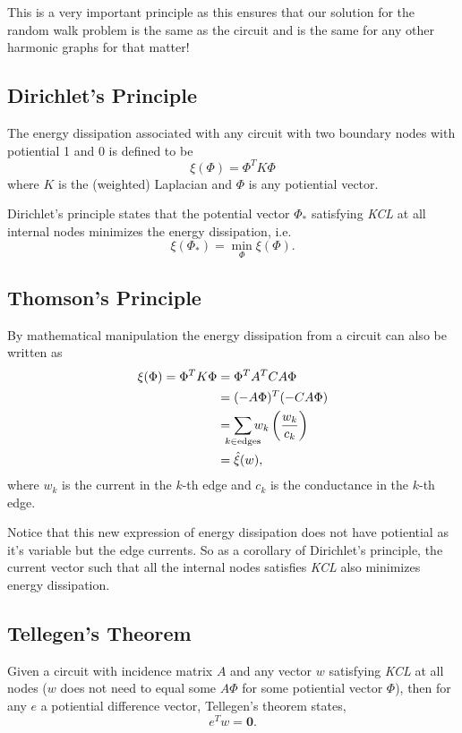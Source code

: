 \documentclass[]{article}
\begin{document}
This is a very important principle as this ensures that our solution for
the random walk problem is the same as the circuit and is the same for
any other harmonic graphs for that matter!

\subsection{Dirichlet's Principle}\label{dirichlets-principle}

The energy dissipation associated with any circuit with two boundary
nodes with potiential 1 and 0 is defined to be \[
\xi(\Phi) = \Phi^T K \Phi
\] where \(K\) is the (weighted) Laplacian and \(\Phi\) is any
potiential vector.

Dirichlet's principle states that the potential vector \(\Phi_*\)
satisfying \emph{KCL} at all internal nodes minimizes the energy
dissipation, i.e. \[\xi(\Phi_*) = \min_\Phi \xi(\Phi).\]

\subsection{Thomson's Principle}\label{thomsons-principle}

By mathematical manipulation the energy dissipation from a circuit can
also be written as \[
\begin{split}
\xi(\Phi) = \Phi^T K \Phi & = \Phi^T A^T C A \Phi\\
& = (-A \Phi)^T (-CA \Phi)\\
& = \sum_{\mathclap{k \in \text{edges}}} w_k\left(\frac{w_k}{c_k}\right)\\
& = \hat{\xi}(w),
\end{split}
\] where \(w_k\) is the current in the \(k\)-th edge and \(c_k\) is the
conductance in the \(k\)-th edge.

Notice that this new expression of energy dissipation does not have
potiential as it's variable but the edge currents. So as a corollary of
Dirichlet's principle, the current vector such that all the internal
nodes satisfies \emph{KCL} also minimizes energy dissipation.

\subsection{Tellegen's Theorem}\label{tellegens-theorem}

Given a circuit with incidence matrix \(A\) and any vector \(w\)
satisfying \emph{KCL} at all nodes (\(w\) does not need to equal some
\(A\Phi\) for some potiential vector \(\Phi\)), then for any \(e\) a
potiential difference vector, Tellegen's theorem states,
\[ e^T w = \mathbf{0}. \]
\end{document}
